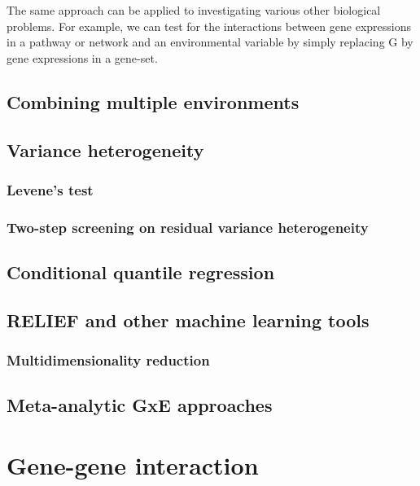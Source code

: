 \documentclass[]{book}
\theoremstyle{definition}
\theoremstyle{definition}
\theoremstyle{definition}
\theoremstyle{remark}
\begin{document}
The same approach can be applied to investigating various other
biological problems. For example, we can test for the interactions
between gene expressions in a pathway or network and an environmental
variable by simply replacing G by gene expressions in a gene-set.

\section{Combining multiple
environments}\label{combining-multiple-environments}

\section{Variance heterogeneity}\label{variance-heterogeneity}

\subsection{Levene's test}\label{levenes-test}

\subsection{Two-step screening on residual variance
heterogeneity}\label{two-step-screening-on-residual-variance-heterogeneity}

\section{Conditional quantile
regression}\label{conditional-quantile-regression}

\section{RELIEF and other machine learning
tools}\label{relief-and-other-machine-learning-tools}

\subsection{Multidimensionality
reduction}\label{multidimensionality-reduction}

\section{Meta-analytic GxE
approaches}\label{meta-analytic-gxe-approaches}

\chapter{Gene-gene interaction}\label{gene-gene-interaction}
\end{document}

